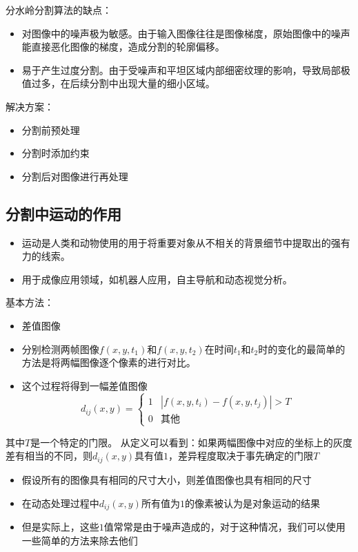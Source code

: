 分水岭分割算法的缺点：
\begin{itemize}
	\item 对图像中的噪声极为敏感。由于输入图像往往是图像梯度，原始图像中的噪声能直接恶化图像的梯度，造成分割的轮廓偏移。 
	\item 易于产生过度分割。由于受噪声和平坦区域内部细密纹理的影响，导致局部极值过多，在后续分割中出现大量的细小区域。
\end{itemize}

解决方案：
\begin{itemize}
\item 分割前预处理
\item 分割时添加约束
\item 分割后对图像进行再处理
\end{itemize}


\subsection{分割中运动的作用}
\begin{itemize}
\item 运动是人类和动物使用的用于将重要对象从不相关的背景细节中提取出的强有力的线索。
\item 用于成像应用领域，如机器人应用，自主导航和动态视觉分析。
\end{itemize}

基本方法：
\begin{itemize}
\item 差值图像
\item 分别检测两帧图像$f(x,y,t_1)$和$f(x,y,t_2)$在时间$t_1$和$t_2$时的变化的最简单的方法是将两幅图像逐个像素的进行对比。
\item 这个过程将得到一幅差值图像
\[d_{ij}(x,y)=\begin{cases}
1 & |f(x,y,t_i)-f(x,y,t_j)|>T\\
0 & \text{其他}
\end{cases}\]
\end{itemize}

其中$T$是一个特定的门限。
从定义可以看到：如果两幅图像中对应的坐标上的灰度差有相当的不同，则$d_{ij}(x,y)$具有值$1$，差异程度取决于事先确定的门限$T$
\begin{itemize}
\item 假设所有的图像具有相同的尺寸大小，则差值图像也具有相同的尺寸
\item 在动态处理过程中$d_{ij}(x,y)$所有值为$1$的像素被认为是对象运动的结果
\item 但是实际上，这些$1$值常常是由于噪声造成的，对于这种情况，我们可以使用一些简单的方法来除去他们
\end{itemize}

